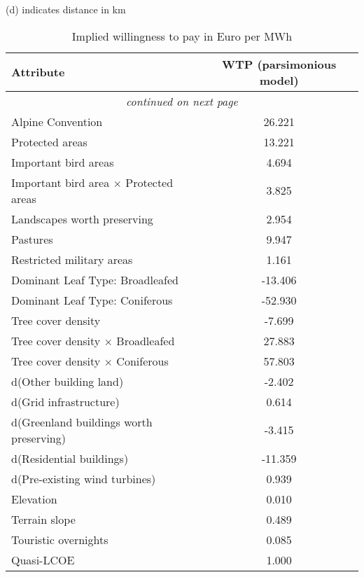 \begin{ThreePartTable}
 \renewcommand\TPTminimum{\textwidth}
    \begin{TableNotes}
        \footnotesize
        \item (d) indicates distance in \si{\kilo\metre}
    \end{TableNotes}
        
    \begin{longtable}{l c}
        \caption{Implied willingness to pay in Euro per MWh} \label{tab:wtp}\\
        \toprule
         \textbf{Attribute}  & \textbf{WTP} (parsimonious model) \\
        \midrule
        \endhead
        \midrule
        \multicolumn{2}{c}{\textit{continued on next page}} 
        \endfoot
        \bottomrule
        \insertTableNotes
        \endlastfoot
         Airports  & 17.292 \\
         Alpine Convention & 26.221\\
         Protected areas & 13.221 \\     
         Important bird areas & 4.694 \\     
         Important bird area $\times$ Protected areas & 3.825 \\
         Landscapes worth preserving & 2.954 \\
         Pastures & 9.947 \\
         Restricted military areas & 1.161 \\
         Dominant Leaf Type: Broadleafed & -13.406 \\
         Dominant Leaf Type: Coniferous & -52.930 \\
         Tree cover density & -7.699 \\
         Tree cover density $\times$ Broadleafed & 27.883 \\
         Tree cover density $\times$ Coniferous & 57.803 \\
         d(Other building land) & -2.402 \\
         d(Grid infrastructure) & 0.614 \\
         d(Greenland buildings worth preserving) & -3.415 \\
         d(Residential buildings) & -11.359 \\
         d(Pre-existing wind turbines) & 0.939 \\
         Elevation & 0.010 \\
         Terrain slope & 0.489 \\
         Touristic overnights & 0.085 \\
         Quasi-LCOE & 1.000 \\
    \end{longtable}
\end{ThreePartTable}
